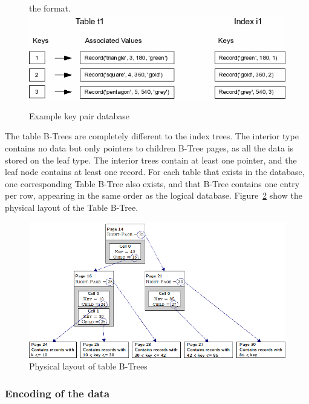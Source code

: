 \begin{figure}[H]the format.
	\centering
	\includegraphics[scale=0.5]{images/examplepop.png}
	\caption{Example key pair database \citep{sqliteray}}
	\label{fig:sqlite_key_pair}
\end{figure}

The table B-Trees are completely different to the index trees. The interior type contains no data but only pointers to children B-Tree pages, as all the data is stored on the leaf type. The interior trees contain at least one pointer, and the leaf node contains at least one record. For each table that exists in the database, one corresponding Table B-Tree also exists, and that B-Tree contains one entry per row, appearing in the same order as the logical database. Figure~\ref{fig:sqlite_table_btree} show the physical layout of the Table B-Tree. 

\begin{figure}[H]
	\centering
	\includegraphics[scale=0.5]{images/sqlite_table_btree.png}
	\caption{Physical layout of table B-Trees \citep{chibd}}
	\label{fig:sqlite_table_btree}
\end{figure}

\subsubsection{Encoding of the data}
\label{subsubsec:sqlite_data_encoding}

